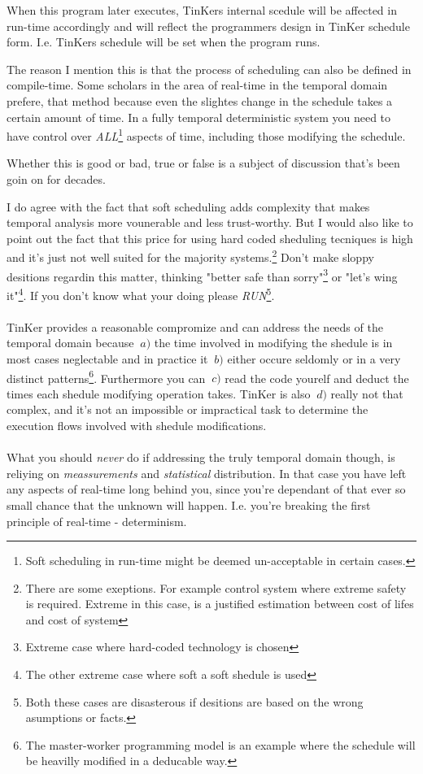 When this program later executes, TinKers internal scedule will be affected in run-time accordingly and will reflect the programmers design in TinKer schedule form. I.e. TinKers schedule will be set when the program runs. 

The reason I mention this is that the process of scheduling can also be defined in compile-time. Some scholars in the area of real-time in the temporal domain prefere, that method because even the slightes change in the schedule takes a certain amount of time. In a fully temporal deterministic system you need to have control over \textit{ALL}\footnote{Soft scheduling in run-time might be deemed un-acceptable in certain cases.} aspects of time, including those modifying the schedule.

Whether this is good or bad, true or false is a subject of discussion that's been goin on for decades.

I do agree with the fact that soft scheduling adds complexity that makes temporal analysis more vounerable and less trust-worthy. But I would also like to point out the fact that this price for using hard coded sheduling tecniques is high and it's just not well suited for the majority systems.\footnote{There are some exeptions. For example control system where extreme safety is required. Extreme in this case, is a justified estimation between cost of lifes and cost of system} Don't make sloppy desitions regardin this matter, thinking "better safe than sorry"\footnote{Extreme case where hard-coded technology is chosen} or "let's wing it"\footnote{The other extreme case where soft a soft shedule is used}. If you don't know what your doing please \textit{RUN}\footnote{Both these cases are disasterous if desitions are based on the wrong asumptions or facts.}.
\\\\
TinKer provides a reasonable compromize and can address the needs of the temporal domain because $~{a)}$ the time involved in modifying the shedule is in most cases neglectable and in practice it $~{b)}$ either occure seldomly or in a very distinct patterns\footnote{The master-worker programming model is an example where the schedule will be heavilly modified in a deducable way.}. Furthermore you can $~{c)}$ read the code yourelf and deduct the times each shedule modifying operation takes. TinKer is also $~{d)}$ really not that complex, and it's not an impossible or impractical task to determine the execution flows involved with shedule modifications.
\\\\
What you should \textit{never} do if addressing the truly temporal domain though, is reliying on \textit{meassurements} and \textit{statistical} distribution. In that case you have left any aspects of real-time long behind you, since you're dependant of that ever so small chance that the unknown will happen. I.e. you're breaking the first principle of real-time - determinism.


